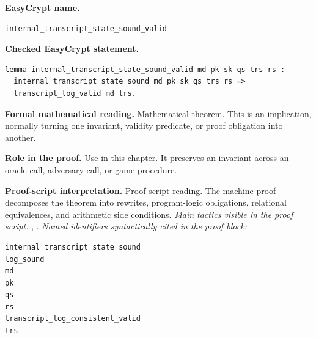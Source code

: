 \begin{formaltheorem}
\noindent\textbf{EasyCrypt name.}
\begin{lstlisting}[language=EasyCrypt,basicstyle=\ttfamily\scriptsize]
internal_transcript_state_sound_valid
\end{lstlisting}
\noindent\textbf{Checked EasyCrypt statement.}
\begin{lstlisting}[language=EasyCrypt,basicstyle=\ttfamily\scriptsize]
lemma internal_transcript_state_sound_valid md pk sk qs trs rs :
  internal_transcript_state_sound md pk sk qs trs rs =>
  transcript_log_valid md trs.
\end{lstlisting}
\noindent\textbf{Formal mathematical reading.}
Mathematical theorem. This is an implication, normally turning one invariant, validity predicate, or proof obligation into another.

\noindent\textbf{Role in the proof.}
Use in this chapter. It preserves an invariant across an oracle call, adversary call, or game procedure.

\noindent\textbf{Proof-script interpretation.}
Proof-script reading. The machine proof decomposes the theorem into rewrites, program-logic obligations, relational equivalences, and arithmetic side conditions.
\emph{Main tactics visible in the proof script:} , .
\emph{Named identifiers syntactically cited in the proof block:}
\begin{lstlisting}[language=EasyCrypt,basicstyle=\ttfamily\scriptsize]
internal_transcript_state_sound
log_sound
md
pk
qs
rs
transcript_log_consistent_valid
trs
\end{lstlisting}

\end{formaltheorem}

